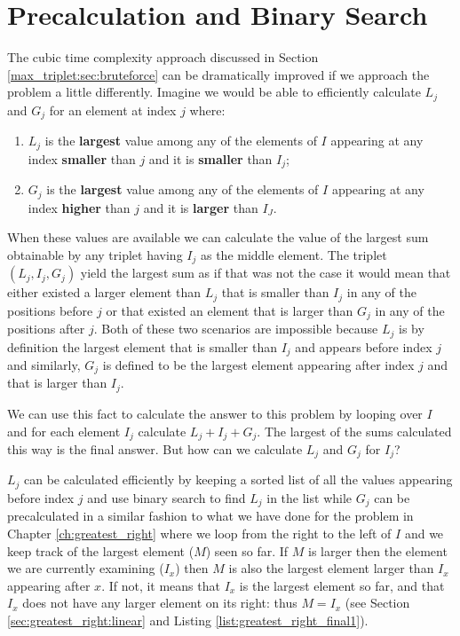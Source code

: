 \section{Precalculation and Binary Search}
The cubic time complexity approach discussed in Section \ref{max_triplet:sec:bruteforce} can be
dramatically improved if we approach the problem a little differently. Imagine we would be able to
efficiently calculate $L_j$ and $G_j$ for an element at index $j$ where:
\begin{enumerate}
	\item $L_j$ is the \textbf{largest} value among any of the elements of $I$ appearing at any
	index \textbf{smaller} than $j$ and it is \textbf{smaller} than $I_j$;
	\item $G_j$ is the \textbf{largest} value among any of the elements of $I$ appearing at any
	index \textbf{higher} than $j$ and it is \textbf{larger} than $I_J$.
\end{enumerate}
When these values are available we can calculate the value of the largest sum obtainable by any
triplet having $I_j$  as the middle element. The triplet $(L_j, I_j, G_j)$ yield the largest sum
as if that was not the case it would mean that either existed a larger element than $L_j$ that is smaller
than $I_j$ in any of the positions before $j$ or that existed an element that is larger than $G_j$
in any of the positions after $j$. 
Both of these two scenarios are impossible  because $L_j$ is by
definition the largest element that is smaller than $I_j$ and appears before index $j$  and
similarly,  $G_j$ is defined to be the largest element appearing after index $j$ and that is larger
than $I_j$.

We can use this fact to calculate the answer to this problem by looping over $I$ and for each
element $I_j$ calculate $L_j+ I_j+ G_j$. The largest of the sums calculated this way is the final
answer. But how can we calculate $L_j$ and $G_j$ for $I_j$?

$L_j$ can be calculated efficiently by keeping a sorted list of all the values appearing before
index $j$ and use binary search to find $L_j$ in the list while $G_j$ can be precalculated in a
similar fashion to what we have done for the problem in Chapter \ref{ch:greatest_right} where we loop
from the right to the left of $I$ and we keep track of the largest element ($M$) seen so far. If $M$ is larger
then the element we are currently examining ($I_x$) then $M$ is also the largest element larger than $I_x$ appearing after $x$.
If not, it means that $I_x$ is the largest element so far, and that $I_x$ does not have any larger element on its right: thus $M = I_x$ (see Section \ref{sec:greatest_right:linear} and Listing \ref{list:greatest_right_final1}).
